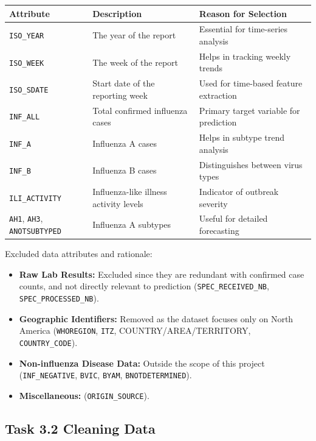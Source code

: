 \begin{longtable}{|>{\raggedright\arraybackslash}p{3cm}|>{\raggedright\arraybackslash}p{4cm}|>{\raggedright\arraybackslash}p{4cm}|}
\hline
Attribute & Description & Reason for Selection \\
\hline
\endhead
\hline
\texttt{ISO\_YEAR} & The year of the report & Essential for time-series analysis \\
\hline
\texttt{ISO\_WEEK} & The week of the report & Helps in tracking weekly trends \\
\hline
\texttt{ISO\_SDATE} & Start date of the reporting week & Used for time-based feature extraction \\
\hline
\texttt{INF\_ALL} & Total confirmed influenza cases & Primary target variable for prediction \\
\hline
\texttt{INF\_A} & Influenza A cases & Helps in subtype trend analysis \\
\hline
\texttt{INF\_B} & Influenza B cases & Distinguishes between virus types \\
\hline
\texttt{ILI\_ACTIVITY} & Influenza-like illness activity levels & Indicator of outbreak severity \\
\hline
\texttt{AH1}, \texttt{AH3}, \texttt{ANOTSUBTYPED} & Influenza A subtypes & Useful for detailed forecasting \\
\hline
\end{longtable}

Excluded data attributes and rationale:
\begin{itemize}
  \item \textbf{Raw Lab Results:} Excluded since they are redundant with confirmed case counts, and not directly relevant to prediction (\texttt{SPEC\_RECEIVED\_NB}, \texttt{SPEC\_PROCESSED\_NB}).
  \item \textbf{Geographic Identifiers:} Removed as the dataset focuses only on North America (\texttt{WHOREGION}, \texttt{ITZ}, COUNTRY/AREA/TERRITORY, \texttt{COUNTRY\_CODE}).
  \item \textbf{Non-influenza Disease Data:} Outside the scope of this project (\texttt{INF\_NEGATIVE}, \texttt{BVIC}, \texttt{BYAM}, \texttt{BNOTDETERMINED}).
  \item \textbf{Miscellaneous:} (\texttt{ORIGIN\_SOURCE}).
\end{itemize}

\subsection*{Task 3.2 Cleaning Data}

